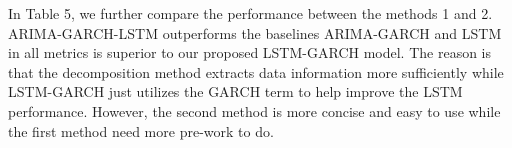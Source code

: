 In Table 5, we further compare the performance between the methods 1 and 2.  ARIMA-GARCH-LSTM  outperforms the baselines ARIMA-GARCH and LSTM in all metrics  is superior to our proposed  LSTM-GARCH model. The reason is that the decomposition method  extracts data information more sufficiently while LSTM-GARCH just utilizes the GARCH term to help improve the LSTM performance. However, the second method is more concise and easy to use while the first method need more pre-work to do. 








